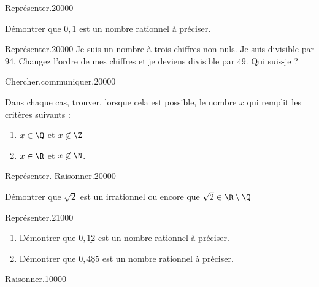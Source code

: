 \begin{pageExercices} 


\begin{ExoCuN}{Représenter.}{2}{0}{0}{0}{0}

Démontrer que $0,\underline{1}$ est un nombre rationnel à préciser.
 
\end{ExoCuN}
 
\begin{ExoCuN}{Représenter.}{2}{0}{0}{0}{0}
Je suis un nombre à trois chiffres non nuls. Je suis divisible par 94. Changez l'ordre de mes chiffres et je deviens divisible par 49.
Qui suis-je ? 
\end{ExoCuN}


\begin{ExoCdN}{Chercher.communiquer.}{2}{0}{0}{0}{0}
 
Dans chaque cas, trouver, lorsque cela est possible, le nombre $x$ qui remplit les critères suivants :
\begin{enumerate}
\item $x \in \Q$ et $x \not\in \Z$
\item $x \in \R$ et $x \not\in \N$. 
\end{enumerate}
\end{ExoCdN}

\begin{ExoCdN}{Représenter. Raisonner.}{2}{0}{0}{0}{0}

Démontrer que $\sqrt{2}$ est un irrationnel ou encore que $\sqrt{2} \in \R\setminus\Q$

\end{ExoCdN}

\begin{ExoCtN}{Représenter.}{2}{1}{0}{0}{0}

\begin{enumerate}
\item Démontrer que $0,\underline{12}$ est un nombre rationnel à préciser.
\item Démontrer que $0,\underline{485}$ est un nombre rationnel à préciser.
\end{enumerate}
\end{ExoCtN}

\begin{ExoCtN}{Raisonner.}{1}{0}{0}{0}{0}


\end{ExoCtN}
\end{pageExercices}
